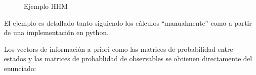 \documentclass[
  a4paper,
  DIV=11,
  numbers=noendperiod]{scrreprt}
\begin{document}
\begin{figure}


\caption{\label{fig-hhm_ejemplo.jpg}Ejemplo HHM}

\end{figure}%

El ejemplo es detallado tanto siguiendo los cálculos ``manualmente''
como a partir de una implementación en python.

Los vectors de información a priori como las matrices de probabilidad
entre estados y las matrices de probablidad de observables se obtienen
directamente del enunciado:
\end{document}
